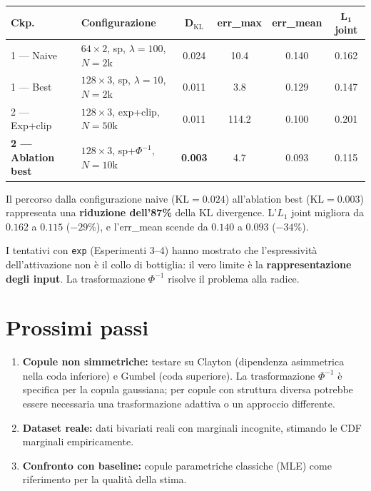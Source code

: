 \documentclass[11pt, a4paper]{article}
\begin{document}
\begin{center}
\begin{tabular}{llcccc}
\toprule
\textbf{Ckp.} & \textbf{Configurazione} & $\boldsymbol{D_\mathrm{KL}}$ & \textbf{err\_max} & \textbf{err\_mean} & $\boldsymbol{L_1}$ \textbf{joint} \\
\midrule
1 --- Naive        & $64 \times 2$, sp, $\lambda\!=\!100$, $N\!=\!2\text{k}$         & 0.024  & 10.4   & 0.140 & 0.162 \\
1 --- Best         & $128 \times 3$, sp, $\lambda\!=\!10$, $N\!=\!2\text{k}$          & 0.011  & 3.8    & 0.129 & 0.147 \\
2 --- Exp+clip     & $128 \times 3$, exp+clip, $N\!=\!50\text{k}$    & 0.011  & 114.2  & 0.100 & 0.201 \\
\textbf{2 --- Ablation best}  & $128 \times 3$, sp+$\Phi^{-1}$, $N\!=\!10\text{k}$ & \textbf{0.003} & 4.7 & 0.093 & 0.115 \\
\bottomrule
\end{tabular}
\end{center}

Il percorso dalla configurazione naive ($\text{KL} = 0.024$) all'ablation best ($\text{KL} = 0.003$) rappresenta una \textbf{riduzione dell'87\%} della KL divergence. L'$L_1$ joint migliora da $0.162$ a $0.115$ ($-29\%$), e l'err\_mean scende da $0.140$ a $0.093$ ($-34\%$).

I tentativi con \texttt{exp} (Esperimenti 3--4) hanno mostrato che l'espressività dell'attivazione non è il collo di bottiglia: il vero limite è la \textbf{rappresentazione degli input}. La trasformazione $\Phi^{-1}$ risolve il problema alla radice.

\section{Prossimi passi}

\begin{enumerate}
    \item \textbf{Copule non simmetriche:} testare su Clayton (dipendenza asimmetrica nella coda inferiore) e Gumbel (coda superiore). La trasformazione $\Phi^{-1}$ è specifica per la copula gaussiana; per copule con struttura diversa potrebbe essere necessaria una trasformazione adattiva o un approccio differente.
    \item \textbf{Dataset reale:} dati bivariati reali con marginali incognite, stimando le CDF marginali empiricamente.
    \item \textbf{Confronto con baseline:} copule parametriche classiche (MLE) come riferimento per la qualità della stima.
\end{enumerate}
\end{document}
